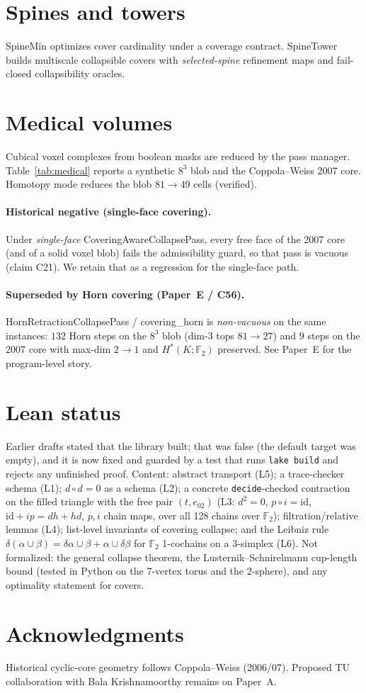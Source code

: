 \documentclass[11pt]{article}
\begin{document}
\section{Spines and towers}
\textsf{SpineMin} optimizes cover cardinality under a coverage contract.
\textsf{SpineTower} builds multiscale collapsible covers with
\emph{selected-spine} refinement maps and fail-closed collapsibility oracles.

\section{Medical volumes}
Cubical voxel complexes from boolean masks are reduced by the pass manager.
Table~\ref{tab:medical} reports a synthetic $8^3$ blob and the Coppola--Weiss 2007
core.  Homotopy mode reduces the blob $81\to 49$ cells (verified).

\paragraph{Historical negative (single-face covering).}
Under \emph{single-face} \textsf{CoveringAwareCollapsePass}, every free face of the
2007 core (and of a solid voxel blob) fails the admissibility guard, so that pass
is vacuous (claim C21).  We retain that as a regression for the single-face path.

\paragraph{Superseded by Horn covering (Paper~E / C56).}
\textsf{HornRetractionCollapsePass} / \textsf{covering\_horn} is \emph{non-vacuous}
on the same instances: $132$ Horn steps on the $8^3$ blob (dim-$3$ tops $81\to 27$)
and $9$ steps on the 2007 core with max-dim $2\to 1$ and $H^*(K;\mathbb{F}_2)$
preserved.  See Paper~E for the program-level story.



\section{Lean status}
Earlier drafts stated that the library built; that was false (the default target was
empty), and it is now fixed and guarded by a test that runs \texttt{lake build} and
rejects any unfinished proof.  Content: abstract transport (L5); a trace-checker schema (L1);
$d\circ d=0$ as a schema (L2); a concrete \texttt{decide}-checked contraction on the filled
triangle with the free pair $(t,e_{02})$ (L3: $d^2=0$, $p\circ i=\mathrm{id}$, $\mathrm{id}+ip=dh+hd$,
$p,i$ chain maps, over all 128 chains over $\mathbb F_2$); filtration/relative lemmas (L4);
list-level invariants of covering collapse; and the Leibniz rule
$\delta(\alpha\cup\beta)=\delta\alpha\cup\beta+\alpha\cup\delta\beta$ for $\mathbb F_2$
1-cochains on a 3-simplex (L6).  Not formalized: the general collapse theorem, the
Lusternik--Schnirelmann cup-length bound (tested in Python on the 7-vertex torus and the
2-sphere), and any optimality statement for covers.

\section*{Acknowledgments}
Historical cyclic-core geometry follows Coppola--Weiss (2006/07).  Proposed
TU collaboration with Bala Krishnamoorthy remains on Paper~A.
\end{document}
